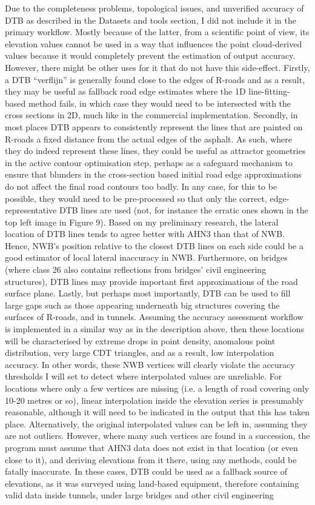 Due to the completeness problems, topological issues, and unverified accuracy of DTB as described in the Datasets and tools section, I did not include it in the primary workflow. Mostly because of the latter, from a scientific point of view, its elevation values cannot be used in a way that influences the point cloud-derived values because it would completely prevent the estimation of output accuracy. However, there might be other uses for it that do not have this side-effect. Firstly, a DTB “verflijn” is generally found close to the edges of R-roads and as a result, they may be useful as fallback road edge estimates where the 1D line-fitting-based method fails, in which case they would need to be intersected with the cross sections in 2D, much like in the commercial implementation. Secondly, in most places DTB appears to consistently represent the lines that are painted on R-roads a fixed distance from the actual edges of the asphalt. As such, where they do indeed represent these lines, they could be useful as attractor geometries in the active contour optimisation step, perhaps as a safeguard mechanism to ensure that blunders in the cross-section based initial road edge approximations do not affect the final road contours too badly. In any case, for this to be possible, they would need to be pre-processed so that only the correct, edge-representative DTB lines are used (not, for instance the erratic ones shown in the top left image in Figure 9). Based on my preliminary research, the lateral location of DTB lines tends to agree better with AHN3 than that of NWB. Hence, NWB’s position relative to the closest DTB lines on each side could be a good estimator of local lateral inaccuracy in NWB. Furthermore, on bridges (where class 26 also contains reflections from bridges’ civil engineering structures), DTB lines may provide important first approximations of the road surface plane. Lastly, but perhaps most importantly, DTB can be used to fill large gaps such as those appearing underneath big structures covering the surfaces of R-roads, and in tunnels. Assuming the accuracy assessment workflow is implemented in a similar way as in the description above, then these locations will be characterised by extreme drops in point density, anomalous point distribution, very large CDT triangles, and as a result, low interpolation accuracy. In other words, these NWB vertices will clearly violate the accuracy thresholds I will set to detect where interpolated values are unreliable. For locations where only a few vertices are missing (i.e. a length of road covering only 10-20 metres or so), linear interpolation inside the elevation series is presumably reasonable, although it will need to be indicated in the output that this has taken place. Alternatively, the original interpolated values can be left in, assuming they are not outliers. However, where many such vertices are found in a succession, the program must assume that AHN3 data does not exist in that location (or even close to it), and deriving elevations from it there, using any methods, could be fatally inaccurate. In these cases, DTB could be used as a fallback source of elevations, as it was surveyed using land-based equipment, therefore containing valid data inside tunnels, under large bridges and other civil engineering 